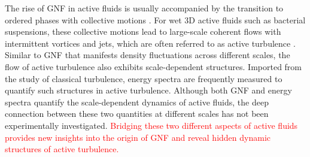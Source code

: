\documentclass[twocolumn,aps,prl,amsmath,amssymb,longbibliography]{revtex4-2}
\begin{document}



The rise of GNF in active fluids is usually accompanied by the transition to ordered phases with collective motions \cite{Ramaswamy2010,Marchetti2013}. For wet 3D active fluids such as bacterial suspensions, these collective motions lead to large-scale coherent flows with intermittent vortices and jets, which are often referred to as active turbulence \cite{Wolgemuth2008,Wensink2012,Dunkel2013a,Bratanov2015,Guo2018,Linkmann2019,Bardfalvy2019,Alert2020,Skultety2020,Peng2020}. Similar to GNF that manifests density fluctuations across different scales, the flow of active turbulence also exhibits scale-dependent structures. Imported from the study of classical turbulence, energy spectra are frequently measured to quantify such structures in active turbulence. Although both GNF and energy spectra quantify the scale-dependent dynamics of active fluids, the deep connection between these two quantities at different scales has not been experimentally investigated. \textcolor{red}{Bridging these two different aspects of active fluids provides new insights into the origin of GNF and reveal hidden dynamic structures of active turbulence.}


\end{document}
